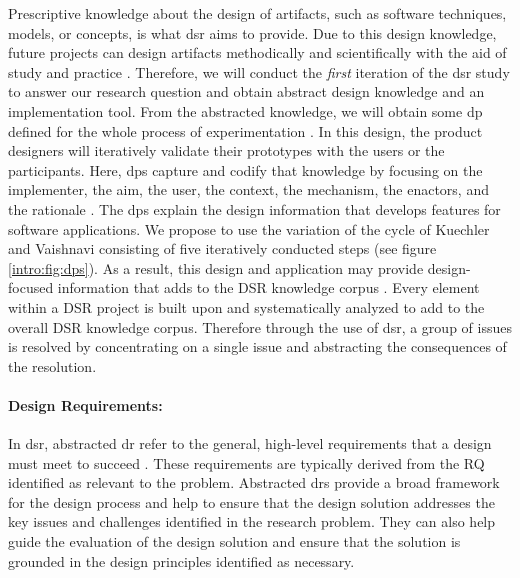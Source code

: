 Prescriptive knowledge about the design of artifacts, such as software techniques, models, or concepts, is what \ac{dsr} aims to provide.
Due to this design knowledge, future projects can design artifacts methodically and scientifically with the aid of study and practice \cite{paper:designprinciple:vk}. 
Therefore, we will conduct the \textit{first} iteration of the \ac{dsr} study to answer our research question and obtain abstract design knowledge and an implementation tool. 
From the abstracted knowledge, we will obtain some \ac{dp} defined for the whole process of experimentation \cite{paper:designprinciple:vk}.
In this design, the product designers will iteratively validate their prototypes with the users or the participants. 
Here, \ac{dp}s capture and codify that knowledge by focusing on the implementer, the aim, the user, the context, the mechanism, the enactors, and the rationale \cite{paper:designprinciple:gregor}. 
The \ac{dp}s explain the design information that develops features for software applications.
We propose to use the variation of the cycle of Kuechler and Vaishnavi \cite{paper:designprinciple:vk} consisting of five iteratively conducted steps (see figure \ref{intro:fig:dps}). 
As a result, this design and application may provide design-focused information that adds to the DSR knowledge corpus \cite{misc:dsr:henver}.
Every element within a DSR project is built upon and systematically analyzed to add to the overall DSR knowledge corpus.
Therefore through the use of \ac{dsr}, a group of issues is resolved by concentrating on a single issue and abstracting the consequences of the resolution.

\paragraph*{Design Requirements:}
In \ac{dsr}, abstracted \ac{dr} refer to the general, high-level requirements that a design must meet to succeed \cite{misc:dsr:webster}. 
These requirements are typically derived from the RQ identified as relevant to the problem.
Abstracted \ac{dr}s provide a broad framework for the design process and help to ensure that the design solution addresses the key issues and challenges identified in the research problem. 
They can also help guide the evaluation of the design solution and ensure that the solution is grounded in the design principles identified as necessary.


